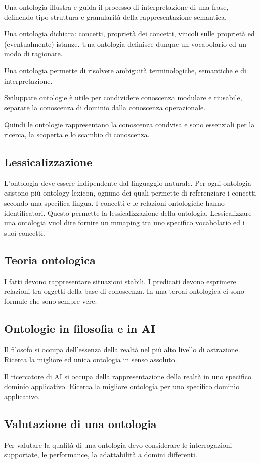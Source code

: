 Una ontologia illustra e guida il processo di interpretazione di una frase, definendo tipo struttura e granularità della rappresentazione semantica.

Una ontologia dichiara: concetti, proprietà dei concetti, vincoli sulle proprietà ed (eventualmente) istanze. Una ontologia definisce dunque un vocabolario ed un modo di ragionare.

Una ontologia permette di risolvere ambiguità terminologiche, semantiche e di interpretazione.

Sviluppare ontologie è utile per condividere conoscenza modulare e riusabile, separare la conoscenza di dominio dalla conoscenza operazionale.

Quindi le ontologie rappresentano la conoscenza condvisa e sono essenziali per la ricerca, la scoperta e lo scambio di conoscenza.


\subsection{Lessicalizzazione}
L'ontologia deve essere indipendente dal linguaggio naturale. Per ogni ontologia esistono più ontology lexicon, ognuno dei quali permette di referenziare i concetti secondo una specifica lingua. I concetti e le relazioni ontologiche hanno identificatori. Questo permette la lessicalizzazione della ontologia.
Lessicalizzare una ontologia vuol dire fornire un mmaping tra uno specifico vocabolario ed i suoi concetti.


\subsection{Teoria ontologica}
I fatti devono rappresentare situazioni stabili. I predicati devono esprimere relazioni tra oggetti della base di conoscenza. In una teroai ontologica ci sono formule che sono sempre vere.


\subsection{Ontologie in filosofia e in AI}
Il filosofo si occupa dell'essenza della realtà nel più alto livello di astrazione. Ricerca la migliore ed unica ontologia in senso assoluto. 

Il ricercatore di AI si occupa della rappresentazione della realtà in uno specifico dominio applicativo. Ricerca la migliore ontologia per uno specifico dominio applicativo.


\subsection{Valutazione di una ontologia}
Per valutare la qualità di una ontologia devo considerare le interrogazioni supportate, le performance, la adattabilità a domini differenti.


